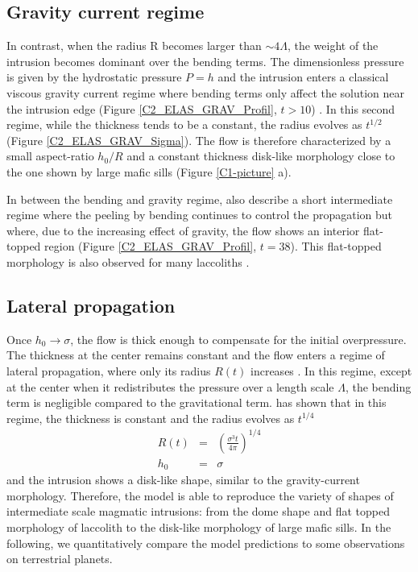 \subsection{Gravity current regime}
\label{C2-sec:grav-curr-regime}

In contrast,  when the radius  R becomes larger than  $\sim 4\Lambda$,
the weight of  the intrusion becomes dominant over  the bending terms.
The  dimensionless  pressure  is  given by  the  hydrostatic  pressure
$P = h$  and the intrusion enters a classical  viscous gravity current
regime where bending terms only affect the solution near the intrusion
edge         (Figure        \ref{C2_ELAS_GRAV_Profil},         $t>10$)
\citep{Huppert:1982a,Michaut:2011kg,Lister:2013ia}.   In  this  second
regime, while the thickness tends to be a constant, the radius evolves
as $t^{1/2}$ (Figure \ref{C2_ELAS_GRAV_Sigma}).  The flow is therefore
characterized by a small aspect-ratio $h_0/R$ and a constant thickness
disk-like  morphology close  to the  one  shown by  large mafic  sills
(Figure \ref{C1-picture} a).

In between the bending  and gravity regime, \citet{Lister:2013ia} also
describe  a short  intermediate regime  where the  peeling by  bending
continues to control the propagation  but where, due to the increasing
effect  of gravity,  the  flow shows  an  interior flat-topped  region
(Figure   \ref{C2_ELAS_GRAV_Profil},    $t=38$).    This   flat-topped
morphology     is     also     observed    for     many     laccoliths
\citep{Koch:1981if,Bunger:2011cb}.

\subsection{Lateral propagation}
\label{C2-sec:lateral-propagation}

Once $h_0\rightarrow \sigma$,  the flow is thick  enough to compensate
for  the initial  overpressure. The  thickness at  the center  remains
constant and  the flow enters  a regime of lateral  propagation, where
only  its radius  $R(t)$  increases  \citep{Michaut:2011kg}.  In  this
regime, except at the center when it redistributes the pressure over a
length scale $\Lambda$, the bending term is negligible compared to the
gravitational  term. \citet{Michaut:2011kg}  has  shown  that in  this
regime, the thickness is constant and the radius evolves as $t^{1/4}$
\begin{eqnarray}
  R(t) &=& \left(\frac{\sigma^3 t}{4\pi}\right)^{1/4}\label{C2-Scaling-R-Propa}\\
  h_0 &=& \sigma\label{C2-Scaling-H-Propa}
\end{eqnarray} 
and  the   intrusion  shows   a  disk-like   shape,  similar   to  the
gravity-current morphology. Therefore, the  model is able to reproduce
the variety of shapes of  intermediate scale magmatic intrusions: from
the  dome  shape  and  flat  topped morphology  of  laccolith  to  the
disk-like  morphology of  large  mafic sills.   In  the following,  we
quantitatively compare  the model predictions to  some observations on
terrestrial planets.


